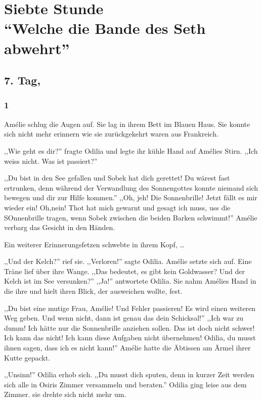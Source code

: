 \part*{Siebte Stunde\\"`Welche die Bande des Seth abwehrt"'}

\chapter*{7. Tag,}

\section*{1}

Amélie schlug die Augen auf. Sie lag in ihrem Bett im Blauen Haus. Sie konnte sich nicht mehr erinnern wie sie zurückgekehrt waren aus Frankreich.

,,Wie geht es dir?'' fragte Odilia und legte ihr kühle Hand auf Amélies Stirn. ,,Ich weiss nicht. Was ist passiert?''

,,Du bist in den See gefallen und Sobek hat dich gerettet! Du wärest fast ertrunken, denn während der Verwandlung des Sonnengottes konnte niemand sich bewegen und dir zur Hilfe kommen.'' ,,Oh, jeh! Die Sonnenbrille! Jetzt fällt es mir wieder ein! Oh,nein! Thot hat mich gewarnt und gesagt ich muss, uss die SOnnenbrille tragen, wenn Sobek zwischen die beiden Barken schwimmt!'' Amélie verbarg das Gesicht in den Händen.

Ein weiterer Erinnerungsfetzen schwebte in ihrem Kopf, \dots

,,Und der Kelch?'' rief sie. ,,Verloren!'' sagte Odilia. Amélie setzte sich auf. Eine Träne lief über ihre Wange. ,,Das bedeutet, es gibt kein Goldwasser? Und der Kelch ist im See versunken?'' ,,Ja!'' antwortete Odilia. Sie nahm Amélies Hand in die ihre und hielt ihren Blick, der ausweichen wollte, fest.

,,Du bist eine mutige Frau, Amélie! Und Fehler passieren! Es wird einen weiteren Weg geben. Und wenn nicht, dann ist genau das dein Schicksal!'' ,,Ich war zu dumm! Ich hätte nur die Sonnenbrille anziehen sollen. Das ist doch nicht schwer! Ich kann das nicht! Ich kann diese Aufgaben nicht übernehmen! Odilia, du musst ihnen sagen, dass ich es nicht kann!'' Amélie hatte die Äbtissen am Ärmel ihrer Kutte gepackt.

,,Unsinn!'' Odilia erhob sich. ,,Du musst dich sputen, denn in kurzer Zeit werden sich alle in Osiris Zimmer versammeln und beraten.'' Odilia ging leise aus dem Zimmer. sie drehte sich nicht mehr um.

